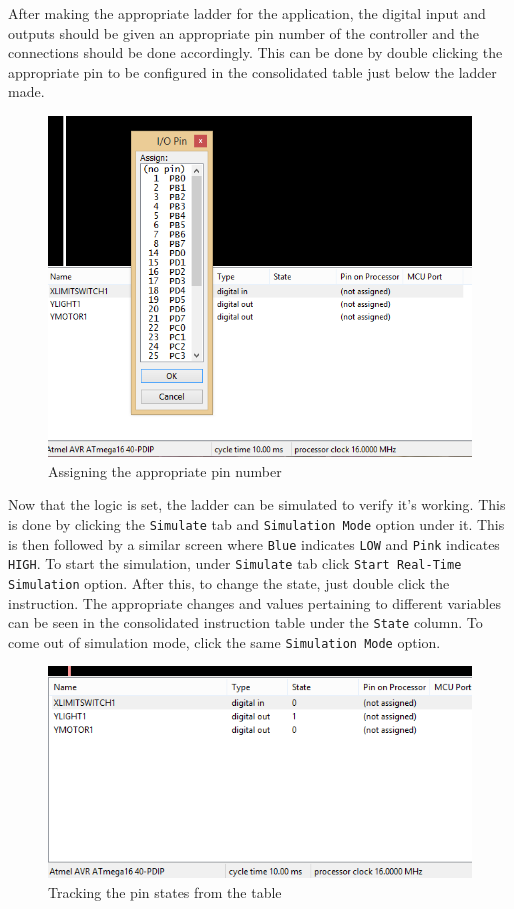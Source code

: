 \documentclass[12pt]{article}
\begin{document}
\vspace{12pt}
\newpage
After making the appropriate ladder for the application, the digital input and outputs should be given an appropriate pin number of the controller and the connections should be done accordingly. This can be done by double clicking the appropriate pin to be configured in the consolidated table just below the ladder made.  \vspace{12pt}
\begin{figure}[h!]
\centering
\includegraphics[scale=0.8]{PIN.png}
\caption{Assigning the appropriate pin number}
\end{figure}
\newpage
Now that the logic is set, the ladder can be simulated to verify it's working. This is done by clicking the \texttt{Simulate} tab and \texttt{Simulation Mode} option under it. This is then followed by a similar screen where \texttt{Blue} indicates \texttt{LOW} and \texttt{Pink} indicates \texttt{HIGH}. To start the simulation, under  \texttt{Simulate} tab click \texttt{Start Real-Time Simulation} option. After this, to change the state, just double click the instruction. The appropriate changes and values pertaining to different variables can be seen in the consolidated instruction table under the \texttt{State} column. To come out of simulation mode, click the same \texttt{Simulation Mode} option. \vspace{12pt}
\begin{figure}[h!]
\centering
\includegraphics[scale=0.8]{states.png}
\caption{Tracking the pin states from the table}
\end{figure}
\end{document}
